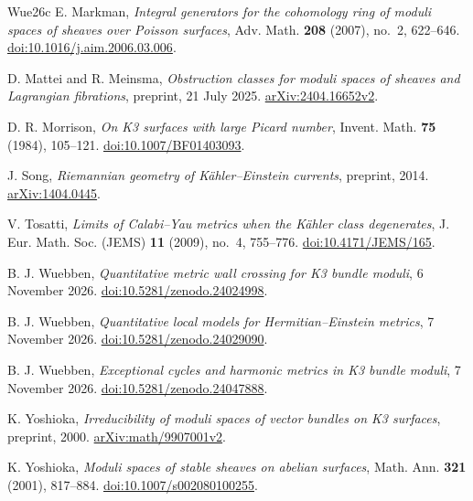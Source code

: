 \begin{thebibliography}{Wue26c}
E. Markman,
\emph{Integral generators for the cohomology ring of moduli spaces
of sheaves over Poisson surfaces}, Adv. Math. \textbf{208} (2007),
no.~2, 622--646.
\href{https://doi.org/10.1016/j.aim.2006.03.006}{doi:10.1016/j.aim.2006.03.006}.

D. Mattei and R. Meinsma,
\emph{Obstruction classes for moduli spaces of sheaves and Lagrangian fibrations},
preprint, 21 July 2025.
\href{https://arxiv.org/abs/2404.16652v2}{arXiv:2404.16652v2}.

D. R. Morrison,
\emph{On K3 surfaces with large Picard number},
Invent. Math. \textbf{75} (1984), 105--121.
\href{https://doi.org/10.1007/BF01403093}{doi:10.1007/BF01403093}.

J. Song,
\emph{Riemannian geometry of K\"ahler--Einstein currents},
preprint, 2014.
\href{https://arxiv.org/abs/1404.0445}{arXiv:1404.0445}.

V. Tosatti,
\emph{Limits of Calabi--Yau metrics when the K\"ahler class degenerates},
J. Eur. Math. Soc. (JEMS) \textbf{11} (2009), no.~4, 755--776.
\href{https://doi.org/10.4171/JEMS/165}{doi:10.4171/JEMS/165}.

B. J. Wuebben,
\emph{Quantitative metric wall crossing for K3 bundle moduli},
6 November 2026.
\href{https://doi.org/10.5281/zenodo.24024998}{doi:10.5281/zenodo.24024998}.

B. J. Wuebben,
\emph{Quantitative local models for Hermitian--Einstein metrics},
7 November 2026.
\href{https://doi.org/10.5281/zenodo.24029090}{doi:10.5281/zenodo.24029090}.

B. J. Wuebben,
\emph{Exceptional cycles and harmonic metrics in K3 bundle moduli},
7 November 2026.
\href{https://doi.org/10.5281/zenodo.24047888}{doi:10.5281/zenodo.24047888}.

K. Yoshioka,
\emph{Irreducibility of moduli spaces of vector bundles on K3 surfaces},
preprint, 2000.
\href{https://arxiv.org/abs/math/9907001v2}{arXiv:math/9907001v2}.

K. Yoshioka,
\emph{Moduli spaces of stable sheaves on abelian surfaces},
Math. Ann. \textbf{321} (2001), 817--884.
\href{https://doi.org/10.1007/s002080100255}{doi:10.1007/s002080100255}.

\end{thebibliography}
